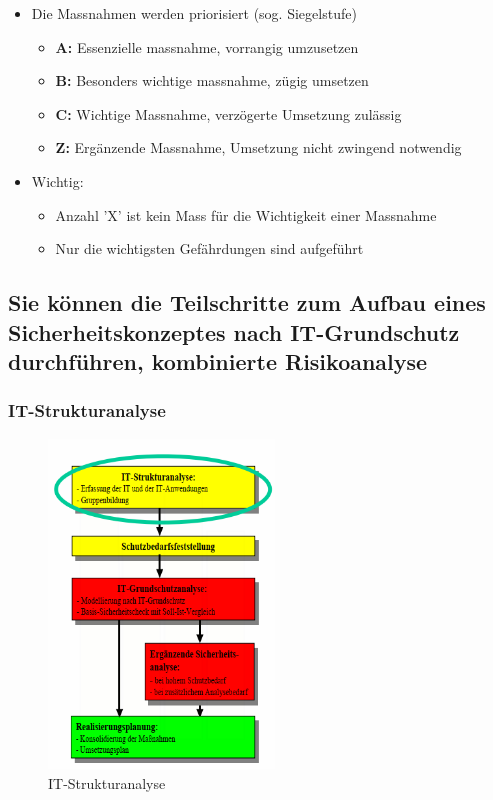 \documentclass[10pt,a4paper]{article}
\begin{document}
\begin{itemize}[noitemsep,topsep=0pt,leftmargin=*]
    \item Die Massnahmen werden priorisiert (sog. Siegelstufe)
    \begin{itemize}[noitemsep,topsep=0pt,leftmargin=*]
        \item \textbf{A:} Essenzielle massnahme, vorrangig umzusetzen
        \item \textbf{B:} Besonders wichtige massnahme, zügig umsetzen
        \item \textbf{C:} Wichtige Massnahme, verzögerte Umsetzung zulässig
        \item \textbf{Z:} Ergänzende Massnahme, Umsetzung nicht zwingend notwendig
    \end{itemize}
    \item Wichtig:
    \begin{itemize}[noitemsep,topsep=0pt,leftmargin=*]
        \item Anzahl 'X' ist kein Mass für die Wichtigkeit einer Massnahme
        \item Nur die wichtigsten Gefährdungen sind aufgeführt
    \end{itemize}
\end{itemize}


\subsection*{Sie können die Teilschritte zum Aufbau eines Sicherheitskonzeptes nach IT-Grundschutz durchführen, kombinierte Risikoanalyse}

\subsubsection*{IT-Strukturanalyse}
\begin{figure}[H]
    \begin{center}
    \includegraphics[width=6cm]{images/Strukturanalyse.png}
    \caption{IT-Strukturanalyse}
    \label{IT-Strukturanalyse}
    \end{center}
\end{figure}
\end{document}
